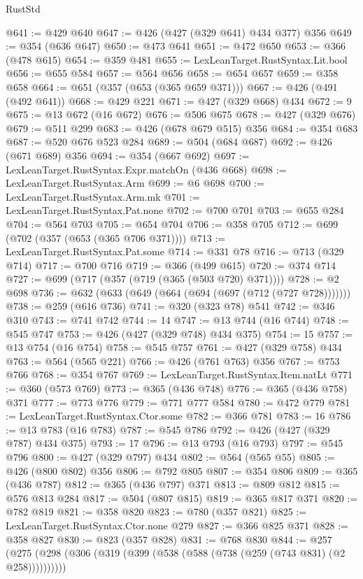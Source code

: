 \begin{lexlean}{RustStd}
\begin{coremodule}
@641 := @429 @640
@647 := @426 (@427 (@329 @641) @434 @377) @356
@649 := @354 (@636 @647)
@650 := @473 @641
@651 := @472 @650
@653 := @366 (@478 @615)
@654 := @359 @481
@655 := LexLeanTarget.RustSyntax.Lit.bool
@656 := @655 @584
@657 := @564 @656
@658 := @654 @657
@659 := @358 @658
@664 := @651 (@357 (@653 (@365 @659 @371)))
@667 := @426 (@491 (@492 @641))
@668 := @429 @221
@671 := @427 (@329 @668) @434
@672 := 9
@675 := @13 @672 (@16 @672)
@676 := @506 @675
@678 := @427 (@329 @676)
@679 := @511 @299
@683 := @426 (@678 @679 @515) @356
@684 := @354 @683
@687 := @520 @676 @523 @284
@689 := @504 (@684 @687)
@692 := @426 (@671 @689) @356
@694 := @354 (@667 @692)
@697 := LexLeanTarget.RustSyntax.Expr.matchOn (@436 @668)
@698 := LexLeanTarget.RustSyntax.Arm
@699 := @6 @698
@700 := LexLeanTarget.RustSyntax.Arm.mk
@701 := LexLeanTarget.RustSyntax.Pat.none
@702 := @700 @701
@703 := @655 @284
@704 := @564 @703
@705 := @654 @704
@706 := @358 @705
@712 := @699 (@702 (@357 (@653 (@365 @706 @371))))
@713 := LexLeanTarget.RustSyntax.Pat.some
@714 := @331 @78
@716 := @713 (@329 @714)
@717 := @700 @716
@719 := @366 (@499 @615)
@720 := @374 @714
@727 := @699 (@717 (@357 (@719 (@365 (@503 @720) @371))))
@728 := @2 @698
@736 := @632 (@633 (@649 (@664 (@694 (@697 (@712 (@727 @728)))))))
@738 := @259 (@616 @736)
@741 := @320 (@323 @78) @541
@742 := @346 @310
@743 := @741 @742
@744 := 14
@747 := @13 @744 (@16 @744)
@748 := @545 @747
@753 := @426 (@427 (@329 @748) @434 @375)
@754 := 15
@757 := @13 @754 (@16 @754)
@758 := @545 @757
@761 := @427 (@329 @758) @434
@763 := @564 (@565 @221)
@766 := @426 (@761 @763) @356
@767 := @753 @766
@768 := @354 @767
@769 := LexLeanTarget.RustSyntax.Item.natLt
@771 := @360 (@573 @769)
@773 := @365 (@436 @748)
@776 := @365 (@436 @758) @371
@777 := @773 @776
@779 := @771 @777 @584
@780 := @472 @779
@781 := LexLeanTarget.RustSyntax.Ctor.some
@782 := @366 @781
@783 := 16
@786 := @13 @783 (@16 @783)
@787 := @545 @786
@792 := @426 (@427 (@329 @787) @434 @375)
@793 := 17
@796 := @13 @793 (@16 @793)
@797 := @545 @796
@800 := @427 (@329 @797) @434
@802 := @564 (@565 @55)
@805 := @426 (@800 @802) @356
@806 := @792 @805
@807 := @354 @806
@809 := @365 (@436 @787)
@812 := @365 (@436 @797) @371
@813 := @809 @812
@815 := @576 @813 @284
@817 := @504 (@807 @815)
@819 := @365 @817 @371
@820 := @782 @819
@821 := @358 @820
@823 := @780 (@357 @821)
@825 := LexLeanTarget.RustSyntax.Ctor.none @279
@827 := @366 @825 @371
@828 := @358 @827
@830 := @823 (@357 @828)
@831 := @768 @830
@844 := @257 (@275 (@298 (@306 (@319 (@399 (@538 (@588 (@738 (@259 (@743 @831) (@2 @258))))))))))

\end{coremodule}
\end{lexlean}
